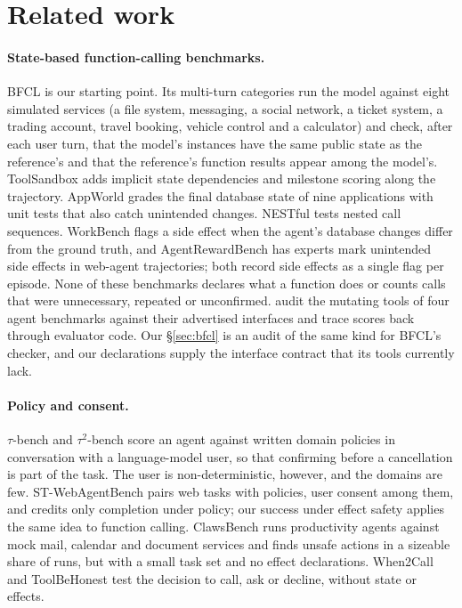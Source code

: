 \documentclass{article}
\begin{document}
\section{Related work}
\label{sec:related}

\paragraph{State-based function-calling benchmarks.} BFCL \citep{patil2025bfcl} is our starting point. Its multi-turn
categories run the model against eight simulated services (a file system, messaging, a social network, a ticket system,
a trading account, travel booking, vehicle control and a calculator) and check, after each user turn, that the model's
instances have the same public state as the reference's and that the reference's function results appear among the
model's. ToolSandbox \citep{lu2025toolsandbox} adds implicit state dependencies and milestone scoring along the
trajectory. AppWorld \citep{trivedi2024appworld} grades the final database state of nine applications with unit tests
that also catch unintended changes. NESTful \citep{basu2024nestful} tests nested call sequences. WorkBench
\citep{styles2024workbench} flags a side effect when the agent's database changes differ from the ground truth, and
AgentRewardBench \citep{lu2025agentrewardbench} has experts mark unintended side effects in web-agent trajectories; both
record side effects as a single flag per episode. None of these benchmarks declares what a function does or counts calls
that were unnecessary, repeated or unconfirmed. \citet{bellibatlu2026audit} audit the mutating tools of four agent
benchmarks against their advertised interfaces and trace scores back through evaluator code. Our \S\ref{sec:bfcl} is an
audit of the same kind for BFCL's checker, and our declarations supply the interface contract that its tools currently
lack.

\paragraph{Policy and consent.} $\tau$-bench and $\tau^2$-bench \citep{yao2024taubench,barres2025tau2} score an agent
against written domain policies in conversation with a language-model user, so that confirming before a cancellation is
part of the task. The user is non-deterministic, however, and the domains are few. ST-WebAgentBench
\citep{levy2026stwebagentbench} pairs web tasks with policies, user consent among them, and credits only completion under
policy; our success under effect safety applies the same idea to function calling. ClawsBench \citep{li2026clawsbench}
runs productivity agents against mock mail, calendar and document services and finds unsafe actions in a sizeable share
of runs, but with a small task set and no effect declarations. When2Call \citep{ross2025when2call} and ToolBeHonest
\citep{zhang2024toolbehonest} test the decision to call, ask or decline, without state or effects.
\end{document}
